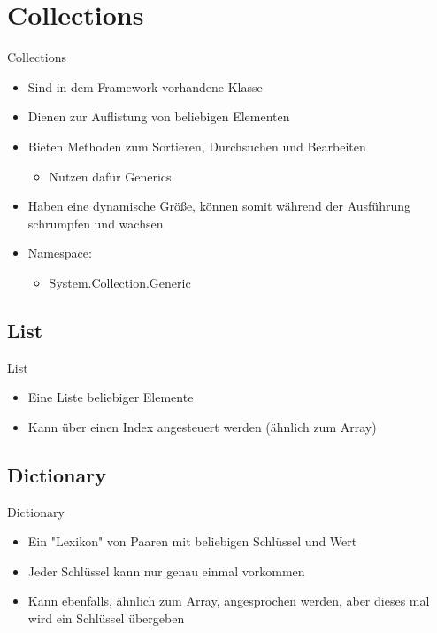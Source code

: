 \section{Collections}
\begin{frame}{Collections}
	\begin{itemize}
		\item Sind in dem Framework vorhandene Klasse
		\item Dienen zur Auflistung von beliebigen Elementen
		\item Bieten Methoden zum Sortieren, Durchsuchen und Bearbeiten
		\begin{itemize}
			\item Nutzen dafür Generics
		\end{itemize}
		\item Haben eine dynamische Größe, können somit während der Ausführung schrumpfen und wachsen
		\item Namespace:
		\begin{itemize}			
			\item \alert{System.Collection.Generic}
		\end{itemize}
	\end{itemize}
\end{frame}

\subsection{List}
\begin{frame}{List}
	\begin{itemize}
		\item Eine Liste beliebiger Elemente
		\item Kann über einen Index angesteuert werden (ähnlich zum Array)
	\end{itemize}
	
\end{frame}

\subsection{Dictionary}
\begin{frame}{Dictionary}
	\begin{itemize}
		\item Ein "Lexikon" von Paaren mit beliebigen Schlüssel und Wert
		\item Jeder Schlüssel kann nur genau einmal vorkommen
		\item Kann ebenfalls, ähnlich zum Array, angesprochen werden, aber dieses mal wird ein Schlüssel übergeben
	\end{itemize}
	
\end{frame}

